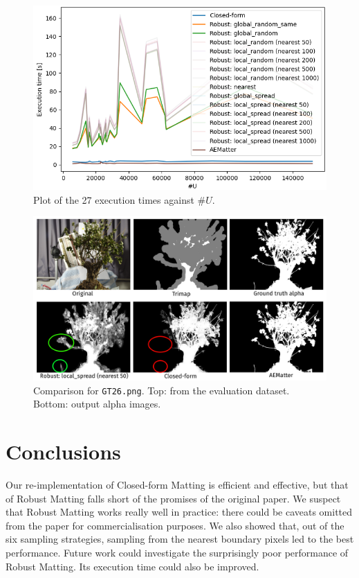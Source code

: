 \documentclass{article}
\theoremstyle{definition}
\begin{document}
\begin{multicols}{2}[]
\begin{figure}[H]
    \centering
    \includegraphics[width=0.88\columnwidth]{t-against-U}
    \caption{Plot of the 27 execution times against $\#U$.}
    \label{fig:t-against-U}
\end{figure}

\begin{figure}[H]
    \centering
    \includegraphics[width=0.88\columnwidth]{qualitative}
    \caption{Comparison for \texttt{GT26.png}. Top: from the evaluation dataset. Bottom: output alpha images.}
    \label{fig:qualitative}
\end{figure}

\section{Conclusions}

Our re-implementation of Closed-form Matting is efficient and effective, but that of Robust Matting falls short of the promises of the original paper. We suspect that Robust Matting works really well in practice: there could be caveats omitted from the paper for commercialisation purposes. We also showed that, out of the six sampling strategies, sampling from the nearest boundary pixels led to the best performance. Future work could investigate the surprisingly poor performance of Robust Matting. Its execution time could also be improved.


\end{multicols}
\newpage


\end{document}
